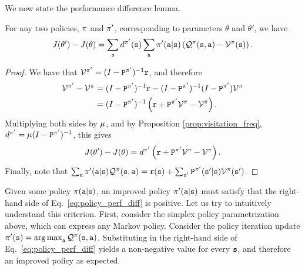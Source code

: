 We now state the performance difference lemma.
\begin{lemma}\label{lemma:perf_diff}
    For any two policies, $\pi$ and $\pi'$, corresponding to parameters $\theta$ and $\theta'$, we have
    \begin{equation}\label{eq:policy_perf_diff}
        J(\theta') - J(\theta)= \sum_{{\tt s}} d^{\pi'}({\tt s}) \sum_{\tt a} \pi'({\tt a}|{\tt s})\left( \mathcal{Q}^{\pi}({\tt s},{\tt a}) - \mathcal{V}^{\pi}({\tt s})\right).
    \end{equation}
\end{lemma}
\begin{proof}
    We have that $\mathcal{V}^{\pi'} = (I - {\tt P}^{\pi'})^{-1}{\tt r}$, and therefore
    \begin{equation*}
    \begin{split}
        \mathcal{V}^{\pi'} - \mathcal{V}^\pi &= (I - {\tt P}^{\pi'})^{-1}{\tt r} - (I - {\tt P}^{\pi'})^{-1} (I - {\tt P}^{\pi'}) \mathcal{V}^\pi \\
        &=(I - {\tt P}^{\pi'})^{-1} \left({\tt r} +{\tt P}^{\pi'}\mathcal{V}^\pi - \mathcal{V}^\pi \right).
    \end{split}
    \end{equation*}
    Multiplying both sides by $\mu$, and by Proposition \ref{prop:visitation_freq}, $d^{\pi'}=\mu (I - {\tt P}^{\pi'})^{-1}$, this gives
    \begin{equation*}
        J(\theta') - J(\theta) = d^{\pi'}\left({\tt r} +{\tt P}^{\pi'}\mathcal{V}^\pi - \mathcal{V}^\pi \right).
    \end{equation*}
    Finally, note that $\sum_{\tt a} \pi'({\tt a}|{\tt s}) \mathcal{Q}^{\pi}({\tt s},{\tt a}) = {\tt r}({\tt s}) + \sum_{{\tt s}'}{\tt P}^{\pi'}({\tt s}'|{\tt s})\mathcal{V}^{\pi}({\tt s}')$.
\end{proof}

Given some policy $\pi({\tt a}|{\tt s})$, an improved policy $\pi'({\tt a}|{\tt s})$ must satisfy that the right-hand side of Eq.~\ref{eq:policy_perf_diff} is positive.
Let us try to intuitively understand this criterion. First, consider the simplex policy parametrization above, which can express any Markov policy.  Consider the policy iteration update $\policy'(\state) = \argmax_{\action} \QValue^{\policy}(\state,\action)$. Substituting in the right-hand side of Eq.~\ref{eq:policy_perf_diff} yields a non-negative value for every ${\tt s}$, and therefore an improved policy as expected.


